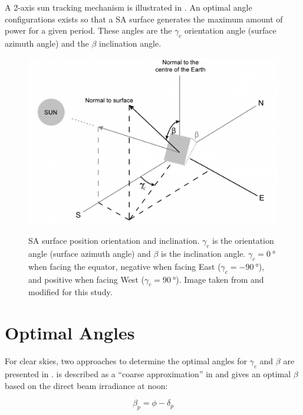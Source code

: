 A 2-axis sun tracking mechanism is illustrated in . An optimal angle configurations exists so that a \ac{SA} surface generates the maximum amount of power for a given period. These angles are the $\gamma_{c}$ orientation angle (surface azimuth angle) and the $\beta$ inclination angle.

\begin{figure}[h]
  \centering
  \hypersetup{linkcolor=captionTextColor}
  \includegraphics[width=0.7\linewidth]{sections/appendix/optimal-angles/images/beta-and-gamma-angles-on-tilted-surface.png}\\
  \caption[Solar array surface position orientation and inclination]
          {\ac{SA} surface position orientation and inclination. $\gamma_{c}$ is the orientation angle (surface azimuth angle) and $\beta$ is the inclination angle. $\gamma_{c} = \SI{0}{\degree}$ when facing the equator, negative when facing East ($\gamma_{c} = \SI{-90}{\degree}$), and positive when facing West ($\gamma_{c} = \SI{+90}{\degree}$). Image taken from  and modified for this study.}
  \label{fig:tilted-surface-sun-tracking}
\end{figure}

\section{Optimal Angles}
For clear skies, two approaches to determine the optimal angles for $\gamma_{c}$ and $\beta$ are presented in .  is described as a ``coarse approximation'' in  and gives an optimal $\beta$ based on the direct beam irradiance at noon:

\begin{equation}
  \label{eq:optimal_beta_irradiance}
  \beta_{p} = \phi - \delta_{p}
\end{equation}

